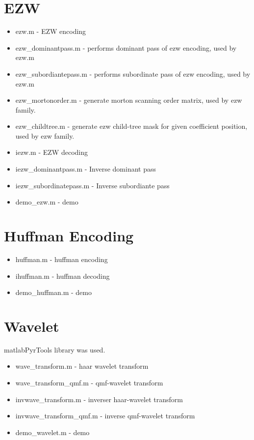 \documentclass[article,oneside]{memoir}
\begin{document}
\section{EZW}

\begin{itemize}
\item ezw.m - EZW encoding
\item ezw\_dominantpass.m - performs dominant pass of ezw encoding, used by ezw.m
\item ezw\_subordiantepass.m - performs subordinate pass of ezw encoding, used by ezw.m
\item ezw\_mortonorder.m - generate morton scanning order matrix, used by ezw family. 
\item ezw\_childtree.m - generate ezw child-tree mask for given coefficient position, used by ezw family.
\item iezw.m - EZW decoding
\item iezw\_dominantpass.m - Inverse dominant pass
\item iezw\_subordinatepass.m - Inverse subordiante pass
\item demo\_ezw.m - demo
\end{itemize}

\section{Huffman Encoding}

\begin{itemize}
\item huffman.m - huffman encoding
\item ihuffman.m - huffman decoding
\item demo\_huffman.m - demo
\end{itemize}

\section{Wavelet}

matlabPyrTools \cite{matlabPyrTools} library was used. 

\begin{itemize}
\item wave\_transform.m - haar wavelet transform
\item wave\_transform\_qmf.m - qmf-wavelet transform
\item invwave\_transform.m - inverser haar-wavelet transform
\item invwave\_transform\_qmf.m - inverse qmf-wavelet transform
\item demo\_wavelet.m - demo
\end{itemize}
\end{document}
